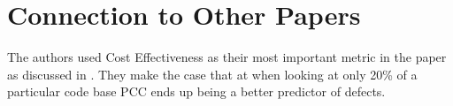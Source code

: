\documentclass[english]{article}
\begin{document}
\section*{Connection to Other Papers}
The authors used Cost Effectiveness as their most important metric in the paper as discussed in \cite{Rahman}.  They make the case that at when looking at only 20\% of a particular code base PCC ends up being a better predictor of defects.



\end{document}
